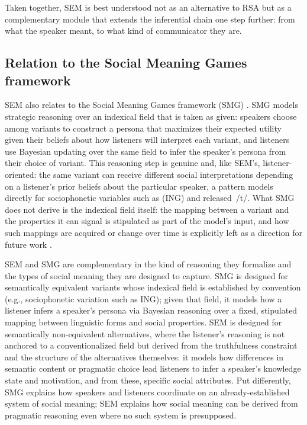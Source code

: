 \documentclass[12pt,a4paper]{article}
\begin{document}
Taken together, SEM is best understood not as an alternative to RSA but as a
complementary module that extends the inferential chain one step further: from
what the speaker meant, to what kind of communicator they are.


\subsection{Relation to the Social Meaning Games framework}

SEM also relates to the Social Meaning Games framework (SMG)
\citep{burnett2017,burnett2019,burnett2023}. SMG models strategic reasoning
over an indexical field that is taken as given: speakers choose among variants
to construct a persona that maximizes their expected utility given their
beliefs about how listeners will interpret each variant, and listeners use
Bayesian updating over the same field to infer the speaker's persona from
their choice of variant. This reasoning step is genuine and, like SEM's,
listener-oriented: the same variant can receive different social
interpretations depending on a listener's prior beliefs about the particular
speaker, a pattern \citet{burnett2019} models directly for sociophonetic
variables such as (ING) and released~/t/. What SMG does not derive is the
indexical field itself: the mapping between a variant and the properties it
can signal is stipulated as part of the model's input, and how such mappings
are acquired or change over time is explicitly left as a direction for future
work \citep{burnett2019}.

SEM and SMG are complementary in the kind of reasoning they formalize 
and the types of social meaning they are designed to capture. SMG is
designed for semantically equivalent variants whose indexical field is
established by convention (e.g., sociophonetic variation such as ING); given
that field, it models how a listener infers a speaker's persona via Bayesian
reasoning over a fixed, stipulated mapping between linguistic forms and social
properties. SEM is designed for semantically non-equivalent alternatives,
where the listener's reasoning is not anchored to a conventionalized field but
derived from the truthfulness constraint and the structure of the alternatives
themselves: it models how differences in semantic content or pragmatic choice
lead listeners to infer a speaker's knowledge state and motivation, and from
these, specific social attributes. Put differently, SMG explains how speakers
and listeners coordinate on an already-established system of social meaning;
SEM explains how social meaning can be derived from pragmatic reasoning even
where no such system is presupposed.
\end{document}
